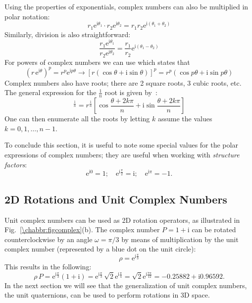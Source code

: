 Using the properties of exponentials, complex numbers can also be multiplied in polar notation:
\begin{equation}
	r_1\mathrm{e}^{\mathrm{i}\theta_1}\cdot r_2\mathrm{e}^{\mathrm{i}\theta_2}=r_1r_2\mathrm{e}^{\mathrm{i}(\theta_1+\theta_2)}
\end{equation}
Similarly, division is also straightforward:
\begin{equation}
	\frac{r_1\mathrm{e}^{\mathrm{i}\theta_1}}{r_2\mathrm{e}^{\mathrm{i}\theta_2}}=\frac{r_1}{r_2}\mathrm{e}^{\mathrm{i}(\theta_1-\theta_2)}
\end{equation}
For powers of complex numbers we can use  which states that
\begin{equation}
	\left(r\,\mathrm{e}^{\mathrm{i}\theta}\right)^p= r^p\mathrm{e}^{\mathrm{i}p\theta} \rightarrow [r(\cos\theta+\mathrm{i}\sin\theta)]^p=r^p(\cos p\theta+\mathrm{i}\sin p\theta)
\end{equation}
Complex numbers also have roots;  there are 2 square roots, 3 cubic roots, etc.  The general expression for the $\frac{1}{n}$ root is given by~:
\begin{equation}
[r(\cos\theta+\mathrm{i}\sin\theta)]^{\frac{1}{n}}=r^{\frac{1}{n}}\left[\cos\frac{\theta+2k\pi}{n}+\mathrm{i}\sin\frac{\theta+2k\pi}{n}\right]
\end{equation}
One can then enumerate all the roots by letting $k$ assume the values $k=0,1,\ldots,n-1$.

To conclude this section, it is useful to note some special values for the polar expressions of complex numbers; they are useful when working with  \textit{structure factors}:
\begin{equation}
	\mathrm{e}^{\mathrm{i}0} = 1;\quad \mathrm{e}^{\mathrm{i}\frac{\pi}{2}} = \mathrm{i};\quad \mathrm{e}^{\mathrm{i}\pi} = -1.
\end{equation}

\subsection{2D Rotations and Unit Complex Numbers}\label{\chabbr:ssec:complexrot}

Unit complex numbers can be used as 2D rotation operators, as illustrated in Fig.~\ref{\chabbr:figcomplex}(b). The complex number $P=1+\mathrm{i}$ can be rotated counterclockwise by an angle $\omega=\pi/3$ by means of multiplication by the unit complex number (represented by a blue dot on the unit circle):
\begin{equation}
	\rho=\mathrm{e}^{\mathrm{i}\frac{\pi}{3}}
\end{equation}
This results in the following:
\begin{equation}
	\rho\,P = \mathrm{e}^{\mathrm{i}\frac{\pi}{3}} (1+\mathrm{i}) = \mathrm{e}^{\mathrm{i}\frac{\pi}{3}}\,\sqrt{2}\mathrm{e}^{\mathrm{i}\frac{\pi}{4}}=
	\sqrt{2}\mathrm{e}^{\mathrm{i}\frac{7\pi}{12}} = -0.25882 + \mathrm{i} 0.96592.
\end{equation}
In the next section we will see that the generalization of unit complex numbers, the unit quaternions, can be used to perform rotations in 3D space.



